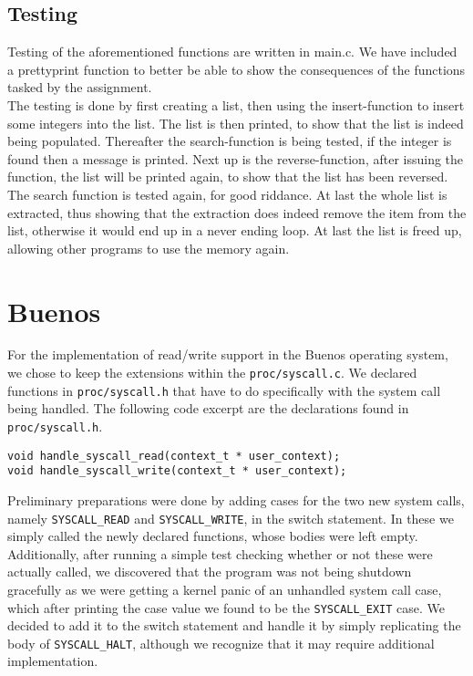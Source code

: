 \documentclass[11pt]{article}
\newcommand{\code}[1]{{\tt #1}}
\newcommand{\file}[1]{{\tt #1}}
\begin{document}
\subsection{Testing}
Testing of the aforementioned functions are written in main.c. We have included
a prettyprint function to better be able to show the consequences of the
functions tasked by the assignment.\\
The testing is done by first creating a list, then using the insert-function to
insert some integers into the list. The list is then printed, to show that the
list is indeed being populated. Thereafter the search-function is being tested,
if the integer is found then a message is printed. Next up is the
reverse-function, after issuing the function, the list will be printed again, to
show that the list has been reversed. The search function is tested again, for
good riddance. At last the whole list is extracted, thus showing that the
extraction does indeed remove the item from the list, otherwise it would end up
in a never ending loop. At last the list is freed up, allowing other programs to
use the memory again.

\newpage
\section{Buenos}
For the implementation of read/write support in the Buenos operating system,
we chose to keep the extensions within the \file{proc/syscall.c}. We declared
functions in \file{proc/syscall.h} that have to do specifically with the
system call being handled. The following code excerpt are the declarations
found in \file{proc/syscall.h}.

\begin{lstlisting}
void handle_syscall_read(context_t * user_context);
void handle_syscall_write(context_t * user_context);
\end{lstlisting}

Preliminary preparations were done by adding cases for the two new system
calls, namely \code{SYSCALL\_READ} and \code{SYSCALL\_WRITE}, in the switch
statement. In these we simply called the newly declared functions, whose
bodies were left empty. Additionally, after running a simple test checking
whether or not these were actually called, we discovered that the program was
not being shutdown gracefully as we were getting a kernel panic of an
unhandled system call case, which after printing the case value we found to be
the \code{SYSCALL\_EXIT} case. We decided to add it to the switch statement
and handle it by simply replicating the body of \code{SYSCALL\_HALT}, although
we recognize that it may require additional implementation.
\end{document}
